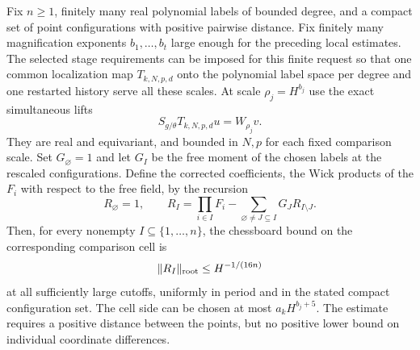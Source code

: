 \begin{proposition}
\label{ch11:n-mark-comparison}
Fix $n\ge1$, finitely many real polynomial labels of bounded
degree, and a compact set of point configurations with positive
pairwise distance. Fix finitely many magnification exponents
$b_1,\ldots,b_t$ large enough for the preceding local estimates.
The selected stage requirements can be imposed for this finite
request so that one common localization map $T_{k,N,p,d}$ onto the polynomial label space
per degree and one restarted history serve all these scales.
At scale $\rho_j=H^{b_j}$ use the exact simultaneous lifts
\[
 S_{g/\theta}T_{k,N,p,d}u=W_{\rho_j}v.
\]
They are real and equivariant, and bounded in $N,p$ for each
fixed comparison scale. Set $G_\varnothing=1$ and let $G_I$
be the free moment of the chosen labels at the rescaled
configurations. Define the corrected coefficients, the Wick products of the $F_i$ with respect to the free field, by the recursion
\[
 R_\varnothing=1,\qquad
 R_I=\prod_{i\in I}F_i-
       \sum_{\varnothing\ne J\subseteq I}G_J R_{I\setminus J}.
\]
Then, for every nonempty $I\subseteq\{1,\ldots,n\}$, the
chessboard bound on the corresponding comparison cell is
\begin{equation}\label{ch11:n-mark-root}
 \|R_I\|_{\rm root}\le H^{-1/(16n)}
\end{equation}
at all sufficiently large cutoffs, uniformly in period and
in the stated compact configuration set.
The cell side can be chosen at most $a_kH^{b_j+5}$.
The estimate requires a positive distance between the points, but no
positive lower bound on individual coordinate differences.
\end{proposition}
